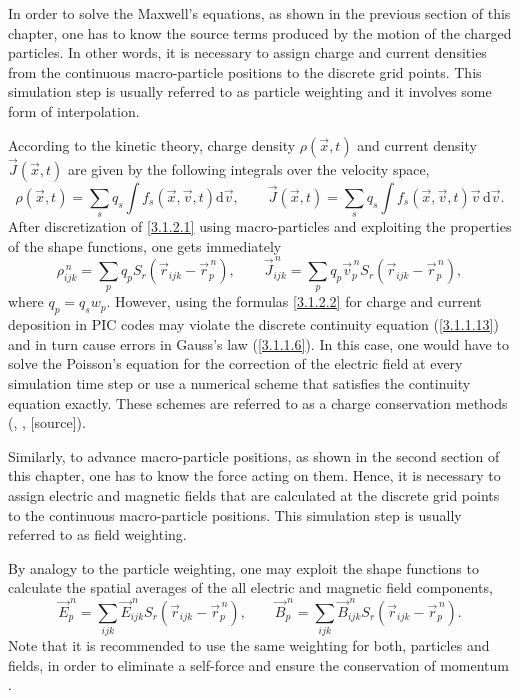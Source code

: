 In order to solve the Maxwell's equations, as shown in the previous section of this chapter, one has to know the source terms produced by the motion of the charged particles. In other words, it is necessary to assign charge and current densities from the continuous macro-particle positions to the discrete grid points. This simulation step is usually referred to as particle weighting and it involves some form of interpolation.
 
According to the kinetic theory, charge density $ \rho\left(\vec{x}, t \right) $ and current density $ \vec{J}\left(\vec{x}, t \right) $ are given by the following integrals over the velocity space,
\begin{equation}
\label{3.1.2.1}
\rho\left(\vec{x}, t \right) = \sum_s q_s \int f_s \left(\vec{x}, \vec{v}, t \right) \mathrm{d} \vec{v}, \qquad \vec{J}\left(\vec{x}, t \right) = \sum_s q_s \int f_s \left(\vec{x}, \vec{v}, t \right) \vec{v} \, \mathrm{d} \vec{v}.
\end{equation}
After discretization of \ref{3.1.2.1} using macro-particles and exploiting the properties of the shape functions, one gets immediately
\begin{equation}
\label{3.1.2.2}
\rho_{ijk}^{\,n} = \sum_{p} q_p S_{r}\left(\vec{r}_{ijk} - \vec{r}_{p}^{\,n}\right), \qquad \vec{J}_{ijk}^{\,n} = \sum_{p} q_p \vec{v}_p^{\,n} S_{r}\left(\vec{r}_{ijk} - \vec{r}_{p}^{\,n}\right),
\end{equation}
where $ q_p = q_s w_p $. However, using the formulas \ref{3.1.2.2} for charge and current deposition in PIC codes may violate the discrete continuity equation (\ref{3.1.1.13}) and in turn cause errors in Gauss's law (\ref{3.1.1.6}). In this case, one would have to solve the Poisson's equation for the correction of the electric field at every simulation time step or use a numerical scheme that satisfies the continuity equation exactly. These schemes are referred to as a charge conservation methods (\cite{villasenor}, \cite{esirkepov}, [source]).

Similarly, to advance macro-particle positions, as shown in the second section of this chapter, one has to know the force acting on them. Hence, it is necessary to assign electric and magnetic fields that are calculated at the discrete grid points to the continuous macro-particle positions. This simulation step is usually referred to as field weighting.

By analogy to the particle weighting, one may exploit the shape functions to calculate the spatial averages of the all electric and magnetic field components,
\begin{equation}
\vec{E}_{p}^{\,n} = \sum_{ijk} \vec{E}_{ijk}^{\,n} S_{r}\left(\vec{r}_{ijk} - \vec{r}_{p}^{\,n}\right), \qquad \vec{B}_{p}^{\,n} = \sum_{ijk} \vec{B}_{ijk}^{\,n} S_{r}\left(\vec{r}_{ijk} - \vec{r}_{p}^{\,n}\right).
\end{equation}
Note that it is recommended to use the same weighting for both, particles and fields, in order to eliminate a self-force and ensure the conservation of momentum \cite{fehske}.

